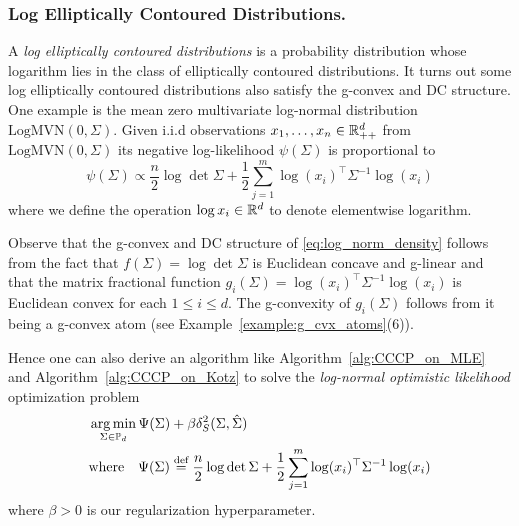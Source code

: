 \documentclass[sn-nature]{sn-jnl}%
\theoremstyle{thmstyleone}%
\theoremstyle{thmstyletwo}%
\theoremstyle{thmstylethree}%
\begin{document}
\subsubsection{Log Elliptically Contoured Distributions.}
A \textit{log elliptically contoured distributions} is a probability distribution whose logarithm lies in the class of elliptically contoured distributions. It turns out some log elliptically contoured distributions also satisfy the g-convex and DC structure. One example is the mean zero multivariate log-normal distribution $\text{LogMVN}(0, \Sigma).$ Given i.i.d observations $x_1, \ldots, x_n \in \mathbb{R}^d_{++}$ from $\text{LogMVN}(0, \Sigma)$ its negative log-likelihood $\psi(\Sigma)$ is proportional to 
\begin{equation}\label{eq:log_norm_density}
\psi(\Sigma) \propto \frac{n}{2}\log \det \Sigma + \frac{1}{2}\sum_{j=1}^m \log (x_i)^\top \Sigma^{-1} \log (x_i)
\end{equation}
where we define the operation $\log x_i \in \mathbb{R}^d$ to denote elementwise logarithm.

Observe that the g-convex and DC structure of \eqref{eq:log_norm_density} follows from the fact that $f(\Sigma) = \log \det \Sigma$ is Euclidean concave and g-linear and that the matrix fractional function $g_i(\Sigma) = \log (x_i)^\top \Sigma^{-1} \log (x_i)$ is Euclidean convex for each $1 \leq i \leq d.$ The g-convexity of $g_i(\Sigma)$ follows from it being a g-convex atom (see Example~\ref{example:g_cvx_atoms}(6)).

Hence one can also derive an algorithm like Algorithm~\ref{alg:CCCP_on_MLE} and Algorithm~\ref{alg:CCCP_on_Kotz} to solve the \emph{log-normal optimistic likelihood} optimization problem 
\[
\begin{aligned}
    &\operatorname*{arg\,min}_{\Sigma \in \mathbb{P}_d} \Psi(\Sigma) + \beta \delta_S^2(\Sigma, \hat{\Sigma})
    \\& \text{where} \quad \Psi(\Sigma) \stackrel{\text{def}}{=} \frac{n}{2}\log\det \Sigma + \frac{1}{2}\sum_{j=1}^m \log(x_i)^\top  \Sigma^{-1} \log (x_i)
\end{aligned}
\]
where $\beta >0$ is our regularization hyperparameter.
\end{document}
